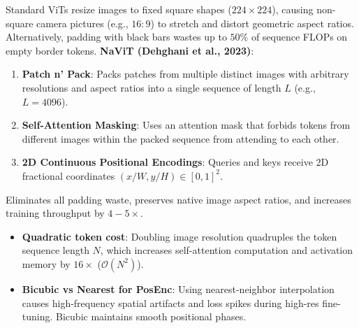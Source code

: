 \begin{qa}
{Standard ViTs resize images to fixed square shapes ($224\times 224$), causing non-square camera pictures (e.g., $16:9$) to stretch and distort geometric aspect ratios. Alternatively, padding with black bars wastes up to $50\%$ of sequence FLOPs on empty border tokens.
\textbf{NaViT (Dehghani et al., 2023)}:
\begin{enumerate}
\item \textbf{Patch n' Pack}: Packs patches from multiple distinct images with arbitrary resolutions and aspect ratios into a single sequence of length $L$ (e.g., $L=4096$).
\item \textbf{Self-Attention Masking}: Uses an attention mask that forbids tokens from different images within the packed sequence from attending to each other.
\item \textbf{2D Continuous Positional Encodings}: Queries and keys receive 2D fractional coordinates $(x/W, y/H) \in [0, 1]^2$.
\end{enumerate}
Eliminates all padding waste, preserves native image aspect ratios, and increases training throughput by $4-5\times$.}
\end{qa}

\begin{trap}
\begin{itemize}
\item \textbf{Quadratic token cost}: Doubling image resolution quadruples the token sequence length $N$, which increases self-attention computation and activation memory by $16\times$ ($\mathcal{O}(N^2)$).
\item \textbf{Bicubic vs Nearest for PosEnc}: Using nearest-neighbor interpolation causes high-frequency spatial artifacts and loss spikes during high-res fine-tuning. Bicubic maintains smooth positional phases.
\end{itemize}
\end{trap}
